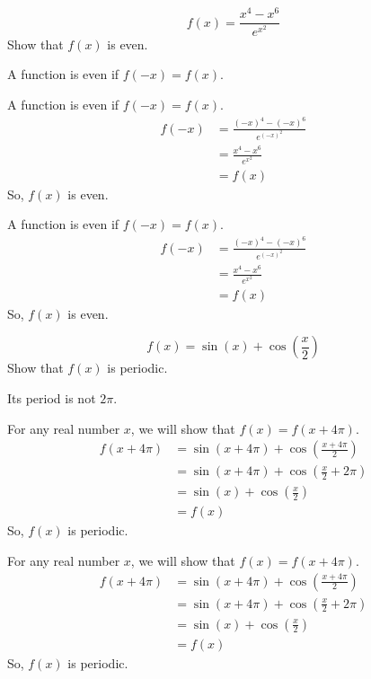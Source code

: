 \begin{Mquestion}
\[f(x)=\frac{x^4-x^6}{e^{x^2}}\]
Show that $f(x)$ is even.
\end{Mquestion}
\begin{hint}
A function is even if $f(-x)=f(x)$.
\end{hint}
\begin{answer}
A function is even if $f(-x)=f(x)$.
\begin{align*}
f(-x)&=\frac{(-x)^4-(-x)^6}{e^{(-x)^2}}\\
&=\frac{x^4-x^6}{e^{x^2}}\\
&=f(x)
\end{align*}
So, $f(x)$ is even.
\end{answer}
\begin{solution}
A function is even if $f(-x)=f(x)$.
\begin{align*}
f(-x)&=\frac{(-x)^4-(-x)^6}{e^{(-x)^2}}\\
&=\frac{x^4-x^6}{e^{x^2}}\\
&=f(x)
\end{align*}
So, $f(x)$ is even.
\end{solution}


\begin{question}
\[f(x)=\sin(x)+\cos\left(\frac{x}{2}\right)\]
Show that $f(x)$ is periodic.
\end{question}
\begin{hint}
Its period is not $2\pi$.
\end{hint}
\begin{answer}
For any real number $x$, we will show that $f(x)=f(x+4\pi)$.
\begin{align*}
f(x+4\pi)&=\sin(x+4\pi)+\cos\left(\frac{x+4\pi}{2}\right)\\
&=\sin(x+4\pi)+\cos\left(\frac{x}{2}+2\pi\right)\\
&=\sin(x)+\cos\left(\frac{x}{2}\right)\\
&=f(x)
\end{align*}
So, $f(x)$ is periodic.
\end{answer}
\begin{solution}
For any real number $x$, we will show that $f(x)=f(x+4\pi)$.
\begin{align*}
f(x+4\pi)&=\sin(x+4\pi)+\cos\left(\frac{x+4\pi}{2}\right)\\
&=\sin(x+4\pi)+\cos\left(\frac{x}{2}+2\pi\right)\\
&=\sin(x)+\cos\left(\frac{x}{2}\right)\\
&=f(x)
\end{align*}
So, $f(x)$ is periodic.
\end{solution}


